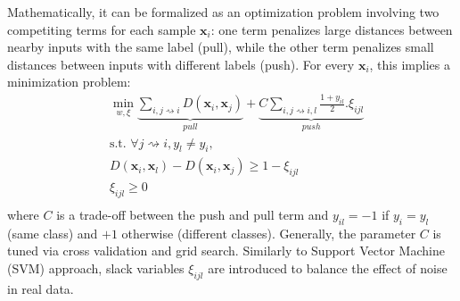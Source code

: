 %
Mathematically, it can be formalized as an optimization problem involving two competiting terms for each sample $\textbf{x}_i$: one term penalizes large distances between nearby inputs with the same label (pull), while the other term penalizes small distances between inputs with different labels (push). For every $\textbf{x}_i$, this implies a minimization problem:
\begin{equation}
\begin{aligned}
&\displaystyle 		\min_{w,\xi}\underbrace{
	\sum\limits_{i,j \rightsquigarrow i}
	D(\textbf{x}_{i},\textbf{x}_{j})
}_{pull}
+
\underbrace{
	C\sum\limits_{i,j \rightsquigarrow i,l} \frac{1+y_{il}}{2}.\xi_{ijl}
}
_{push} \\
&\text{s.t.  } \forall j \rightsquigarrow i, y_l\neq y_i, \\
& D(\textbf{x}_{i},\textbf{x}_{l})-D(\textbf{x}_{i},\textbf{x}_{j}) \geq 1-\xi_{ijl} \\
& \xi_{ijl} \geq 0 \\
\label{eq:OptimizationProblem}
\end{aligned}
\end{equation}
\noindent where $C$ is a trade-off between the push and pull term and $y_{il}=-1$ if $y_i=y_l$ (same class) and $+1$ otherwise (different classes). Generally, the parameter $C$ is tuned via cross validation and grid search. Similarly to Support Vector Machine (SVM) approach, slack variables $\xi_{ijl}$ are introduced to balance the effect of noise in real data. 

